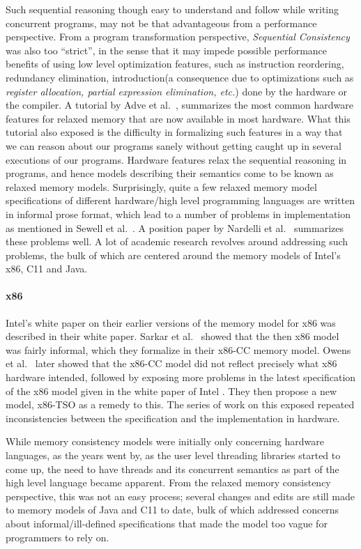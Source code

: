     Such sequential reasoning though easy to understand and follow while writing concurrent programs, may not be that advantageous from a performance perspective.
    From a program transformation perspective, \textit{Sequential Consistency} was also too ``strict'', in the sense that it may impede possible performance benefits of using low level optimization features, such as instruction reordering, redundancy elimination, introduction(a consequence due to optimizations such as \textit{register allocation, partial expression elimination, etc.}) done by the hardware or the compiler.
    A tutorial by Adve et al.~\cite{AdveG}, summarizes the most common hardware features for relaxed memory that are now available in most hardware. 
    What this tutorial also exposed is the difficulty in formalizing such features in a way that we can reason about our programs sanely without getting caught up in several executions of our programs. 
    Hardware features relax the sequential reasoning in programs, and hence models describing their semantics come to be known as relaxed memory models.
    Surprisingly, quite a few relaxed memory model specifications of different hardware/high level programming languages are written in informal prose format, which lead to a number of problems in implementation as mentioned in Sewell et al.~\cite{Sewell}. 
    A position paper by Nardelli et al.~\cite{Nardelli} summarizes these problems well.
    A lot of academic research revolves around addressing such problems, the bulk of which are centered around the memory models of Intel's x86, C11 and Java.  
    
    \paragraph{x86}
    Intel's white paper on their earlier versions of the memory model for x86 was described in their white paper\cite{IntelW}.   
    Sarkar et al.~\cite{SarkarS} showed that the then x86 model was fairly informal, which they formalize in their x86-CC memory model. 
    Owens et al.~\cite{OwensS} later showed that the x86-CC model did not reflect precisely what x86 hardware intended, followed by exposing more problems in the latest specification of the x86 model given in the white paper of Intel \cite{IntelW}. 
    They then propose a new model, x86-TSO as a remedy to this. The series of work on this exposed repeated inconsistencies between the specification and the implementation in hardware. 
    
    While memory consistency models were initially only concerning hardware languages, as the years went by, as the user level threading libraries started to come up, the need to have threads and its concurrent semantics as part of the high level language became apparent.
    From the relaxed memory consistency perspective, this was not an easy process; several changes and edits are still made to memory models of Java and C11 to date, bulk of which addressed concerns about informal/ill-defined specifications that made the model too vague for programmers to rely on. 
    
